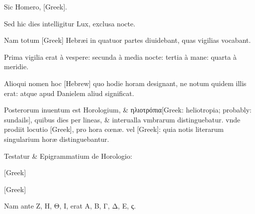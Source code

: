 \begin{parnumbers}

Sic Homero, \textgreek{[Greek]}.

Sed hic dies intelligitur Lux, exclusa nocte.

Nam totum \textgreek{[Greek]} Hebræi in quatuor partes diuidebant, quas vigilias vocabant.

Prima vigilia erat à vespere: secunda à media nocte: tertia à mane: quarta à meridie.

Alioqui nomen hoc \texthebrew{[Hebrew]} quo hodie horam designant, ne notum quidem illis erat: atque apud Danielem aliud significat.

Posterorum inuentum est Horologium, \& \textgreek{ηλιοτρόπια[Greek: heliotropia; probably: sundails]}, quibus dies per lineas, \& interualla vmbrarum distinguebatur. vnde prodiit locutio \textgreek{[Greek]}, pro hora cœnæ. vel \textgreek{[Greek]}:  quia notis literarum singularium horæ distinguebantur.

Testatur \& Epigrammatium de Horologio:

\textgreek{[Greek]}

\textgreek{[Greek]}

Nam ante \textgreek{Ζ, Η, Θ, Ι,} erat \textgreek{Α, Β, Γ, Δ, Ε, ς.}


\end{parnumbers}
